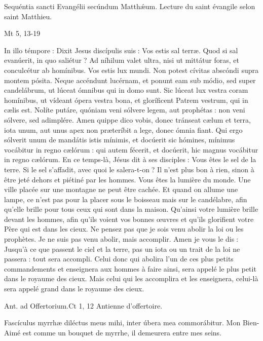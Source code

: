 \begin{paracol}{2}
Sequéntia sancti Evangélii secúndum Matthǽum.
\switchcolumn
Lecture du saint évangile selon saint Matthieu.
\switchcolumn*

Mt 5, 13-19
\switchcolumn

\switchcolumn*

In illo témpore : Dixit Jesus discípulis  suis : Vos estis sal terræ. Quod si sal evanúerit, in quo saliétur ? Ad níhilum valet ultra, nisi ut mittátur foras, et conculcétur ab homínibus. Vos estis lux mundi. Non potest cívitas abscóndi supra montem pósita. Neque accéndunt lucérnam, et ponunt eam sub módio, sed super candelábrum, ut lúceat ómnibus qui in domo sunt. Sic lúceat lux vestra coram homínibus, ut vídeant ópera vestra bona, et gloríficent Patrem vestrum, qui in cælis est. Nolíte putáre, quóniam veni sólvere legem, aut prophétas : non veni sólvere, sed adimplére. Amen quippe dico vobis, donec tránseat cælum et terra, iota unum, aut unus apex non præteríbit a lege, donec ómnia fiant. Qui ergo sólverit unum de mandátis istis mínimis, et docúerit sic hómines, mínimus vocábitur in regno cælórum : qui autem fécerit, et docúerit, hic magnus vocábitur in regno cælórum.
\switchcolumn
En ce temps-là, Jésus dit à ses disciples :  Vous êtes le sel de la terre. Si le sel s’affadit, avec quoi le salera-t-on ? Il n’est plus bon à rien, sinon à être jeté dehors et piétiné par les hommes. Vous êtes la lumière du monde. Une ville placée sur une montagne ne peut être cachée. Et quand on allume une lampe, ce n’est pas pour la placer sous le boisseau mais sur le candélabre, afin qu’elle brille pour tous ceux qui sont dans la maison. Qu’ainsi votre lumière brille devant les hommes, afin qu’ils voient vos bonnes œuvres et qu’ils glorifient votre Père qui est dans les cieux. Ne pensez pas que je sois venu abolir la loi ou les prophètes. Je ne suis pas venu abolir, mais accomplir. Amen je vous le dis : Jusqu’à ce que passent le ciel et la terre, pas un iota ou un trait de la loi ne passera : tout sera accompli. Celui donc qui abolira l’un de ces plus petits commandements et enseignera aux hommes à faire ainsi, sera appelé le plus petit dans le royaume des cieux. Mais celui qui les accomplira et les enseignera, celui-là sera appelé grand dans le royaume des cieux.
\switchcolumn*

Ant. ad Offertorium.\hfill Ct 1, 12
\switchcolumn
Antienne d’offertoire.
\switchcolumn*

Fascículus myrrhæ diléctus meus mihi, inter úbera mea commorábitur.
\switchcolumn
Mon Bien-Aimé est comme un bouquet de myrrhe, il demeurera entre mes seins.
\switchcolumn*


\end{paracol}
